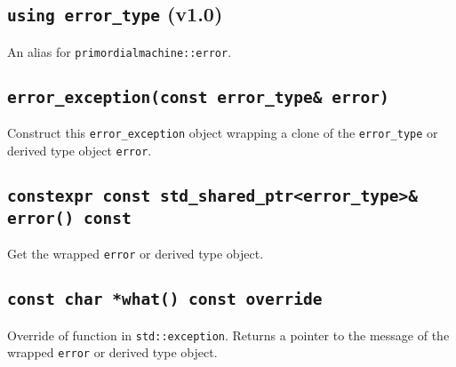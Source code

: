 \documentclass[oneside]{book}
\begin{document}
\subsection{\texttt{using error\_type} (v1.0)}
An alias for \lstinline{primordialmachine::error}.

\subsection{\texttt{error\_exception(const error\_type\& error)}}
Construct this \texttt{error\_exception} object wrapping a clone of the \texttt{error\_type} or
derived type object \texttt{error}.

\subsection{\texttt{constexpr const std\_shared\_ptr\textless{}error\_type\textgreater{}\& error() const}}
Get the wrapped \texttt{error} or derived type object.

\subsection{\texttt{const char *what() const override}}
Override of function in \texttt{std::exception}.
Returns a pointer to the message of the wrapped \texttt{error} or derived type object.
\end{document}
